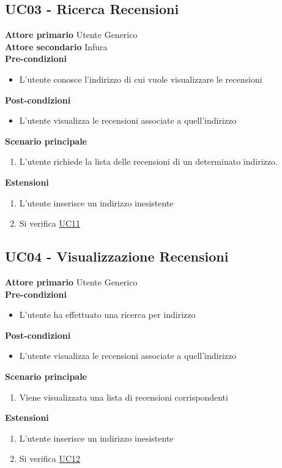 \subsection{UC03 - Ricerca Recensioni}
\textbf{Attore primario} Utente Generico \\
\textbf{Attore secondario} Infura \\
\textbf{Pre-condizioni}
\begin{itemize}
    \item L'utente conosce l'indirizzo di cui vuole visualizzare le recensioni
\end{itemize}
\textbf{Post-condizioni}
\begin{itemize}
    \item L'utente visualizza le recensioni associate a quell'indirizzo
\end{itemize}
\textbf{Scenario principale}
\begin{enumerate}
    \item L'utente richiede la lista delle recensioni di un determinato indirizzo.
\end{enumerate}
\textbf{Estensioni}
\begin{enumerate}
    \item L'utente inserisce un indirizzo inesistente
    \item Si verifica \hyperref[UC11]{UC11}
\end{enumerate}

\subsection{UC04 - Visualizzazione Recensioni}
\textbf{Attore primario} Utente Generico \\
\textbf{Pre-condizioni}
\begin{itemize}
    \item L'utente ha effettuato una ricerca per indirizzo
\end{itemize}
\textbf{Post-condizioni}
\begin{itemize}
    \item L'utente visualizza le recensioni associate a quell'indirizzo
\end{itemize}
\textbf{Scenario principale}
\begin{enumerate}
    \item Viene visualizzata una lista di recensioni corrispondenti
\end{enumerate}
\textbf{Estensioni}
\begin{enumerate}
    \item L'utente inserisce un indirizzo inesistente
    \item Si verifica \hyperref[UC12]{UC12}
\end{enumerate}

